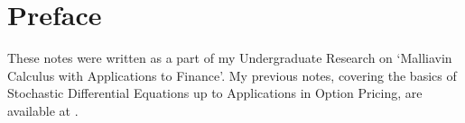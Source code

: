 \documentclass[12pt,a4paper,twoside]{report}
\begin{document}
\chapter*{Preface}

These notes were written as a part of my Undergraduate Research on `Malliavin Calculus with Applications to Finance'. My previous notes, covering the basics of Stochastic Differential Equations up to Applications in Option Pricing, are available at \cite{Silva23stochastic}.











\end{document}
